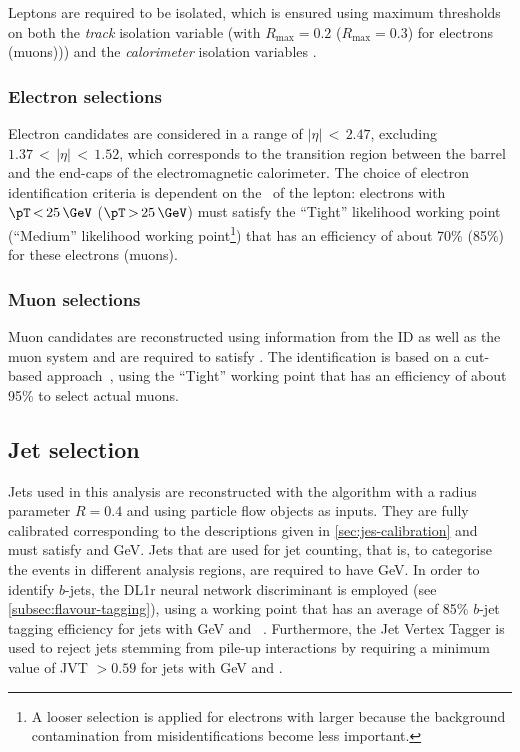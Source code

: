 Leptons are required to be isolated, which is ensured using maximum thresholds on both the \emph{track} isolation variable \pTvarcone (with $R_{\text{max}} = 0.2$ ($R_{\text{max}} = 0.3$) for electrons (muons))) and the \emph{calorimeter} isolation variables \ETconetwenty.

\subsubsection{Electron selections}
Electron candidates are considered in a range of $|\eta| \,{<}\, 2.47$, excluding $1.37\,{<}\,|\eta|\,{<}\,1.52$, which corresponds to the transition region between the barrel and the end-caps of the electromagnetic calorimeter.
The choice of electron identification criteria is dependent on the \pT\ of the lepton: electrons with $\pT \,{<}\,25\,\GeV$ ($\pT\,{>}\,25\,\GeV$) must satisfy the ``Tight'' likelihood working point (``Medium'' likelihood working point\footnote{A looser selection is applied for electrons with larger \pT because the background contamination from misidentifications become less important.}) that has an efficiency of about 70\% (85\%) for these electrons (muons).~\cite{EGAM-2018-01}

\subsubsection{Muon selections}
Muon candidates are reconstructed using information from the ID as well as the muon system and are required to satisfy .
The identification is based on a cut-based approach~\cite{MUON-2018-03}, using the ``Tight'' working point that has an efficiency of about 95\% to select actual muons.

\subsection{Jet selection}
Jets used in this analysis are reconstructed with the \antikt algorithm with a radius parameter $R = 0.4$ and using particle flow objects as inputs.
They are fully calibrated corresponding to the descriptions given in \cref{sec:jes-calibration} and must satisfy  and GeV.
Jets that are used for jet counting, that is, to categorise the events in different analysis regions, are required to have GeV.
In order to identify $b$-jets, the DL1r neural network discriminant is employed (see \cref{subsec:flavour-tagging}), using a working point that has an average of 85\% $b$-jet tagging efficiency for jets with GeV and ~\cite{FTAG-2018-01}.
Furthermore, the Jet Vertex Tagger is used to reject jets stemming from pile-up interactions by requiring a minimum value of JVT $> 0.59$ for jets with GeV and .


